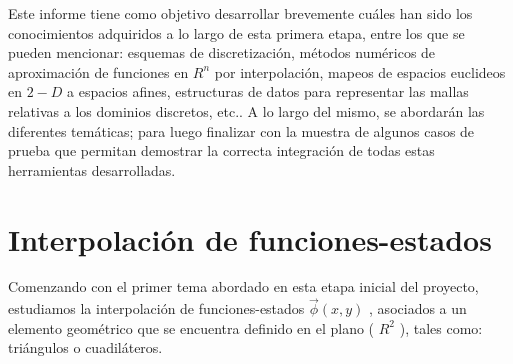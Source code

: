 Este informe tiene como objetivo desarrollar brevemente cuáles han
sido los conocimientos adquiridos a lo largo de esta primera etapa, entre los que se pueden mencionar: esquemas de discretización, métodos
numéricos de aproximación de funciones en $ R^n$ por interpolación, mapeos de espacios euclideos en $2-D$ a espacios afines, estructuras de datos para representar las mallas relativas a los dominios discretos, etc.. A lo largo del mismo, se abordarán las diferentes temáticas; para luego finalizar con la muestra de algunos casos de prueba que permitan demostrar la correcta integración de todas estas herramientas desarrolladas.

\section{Interpolación de funciones-estados}

Comenzando con el primer tema abordado en esta etapa inicial del proyecto, estudiamos la interpolación de funciones-estados $\vec{ \phi } (x,y)$ , asociados a un elemento geométrico que se encuentra definido en el plano ( $R^2$ ), tales como: triángulos o cuadiláteros.

